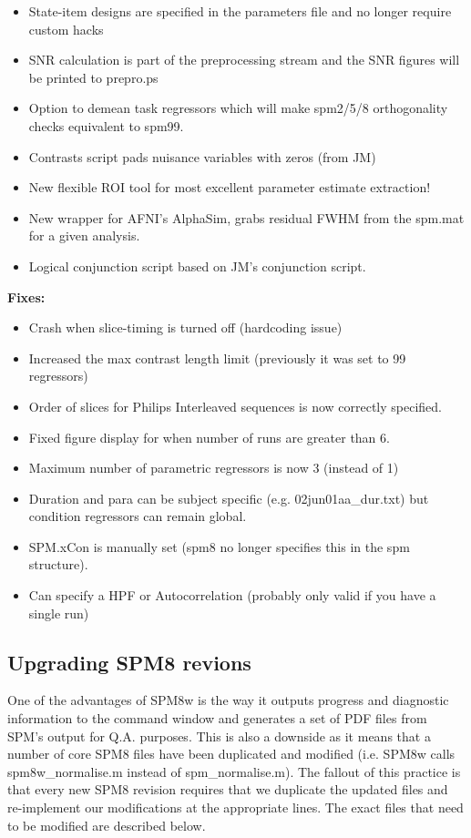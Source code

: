 \documentclass[12pt]{article}
\begin{document}
\begin{itemize}
	\item State-item designs are specified in the parameters file and no longer require custom hacks
	\item SNR calculation is part of the preprocessing stream and the SNR figures will be printed to prepro.ps
	\item Option to demean task regressors which will make spm2/5/8 orthogonality checks equivalent to spm99.
	\item Contrasts script pads nuisance variables with zeros (from JM)
	\item New flexible ROI tool for most excellent parameter estimate extraction!
	\item New wrapper for AFNI’s AlphaSim, grabs residual FWHM from the spm.mat for a given analysis.
	\item Logical conjunction script based on JM’s conjunction script.
\end{itemize}
\noindent
\textbf{Fixes:}
\begin{itemize}
	\item Crash when slice-timing is turned off (hardcoding issue)
	\item Increased the max contrast length limit (previously it was set to 99 regressors)
	\item Order of slices for Philips Interleaved sequences is now correctly specified.
	\item Fixed figure display for when number of runs are greater than 6.
	\item Maximum number of parametric regressors is now 3 (instead of 1)
	\item Duration and para can be subject specific (e.g. 02jun01aa\_dur.txt) but condition regressors can remain global.
	\item SPM.xCon is manually set (spm8 no longer specifies this in the spm structure).
	\item Can specify a HPF or Autocorrelation (probably only valid if you have a single run)
\end{itemize}

\subsection{Upgrading SPM8 revions}
One of the advantages of SPM8w is the way it outputs progress and diagnostic information to the command window and generates a set of PDF files from SPM's output for Q.A. purposes. This is also a downside as it means that a number of core SPM8 files have been duplicated and modified (i.e. SPM8w calls spm8w\_normalise.m instead of spm\_normalise.m). The fallout of this practice is that every new SPM8 revision requires that we duplicate the updated files and re-implement our modifications at the appropriate lines. The exact files that need to be modified are described below.
\end{document}
